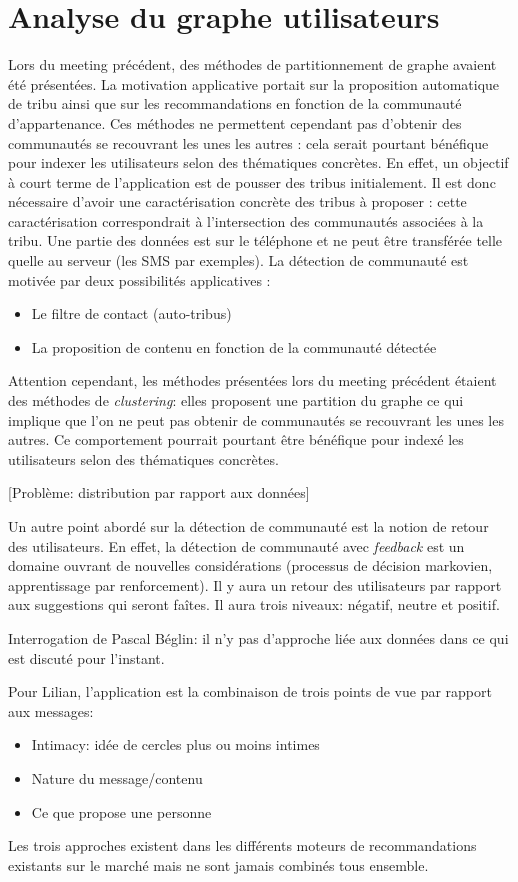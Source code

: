 \documentclass[a4paper]{article}
\begin{document}
\section*{Analyse du graphe utilisateurs}
\label{sec:community_detection}
Lors du meeting précédent, des méthodes de partitionnement de graphe avaient été
présentées. La motivation applicative portait sur la proposition automatique
de tribu ainsi que sur les recommandations en fonction de la communauté
d'appartenance. Ces méthodes ne permettent cependant pas d'obtenir des communautés
se recouvrant les unes les autres : cela serait pourtant bénéfique pour indexer
les utilisateurs selon des thématiques concrètes. En effet, un objectif à court
terme de l'application est de pousser des tribus initialement. Il est donc
nécessaire d'avoir une caractérisation concrète des tribus à proposer : cette
caractérisation correspondrait à l'intersection des communautés associées à la
tribu.
Une partie des données est sur le téléphone et ne peut être transférée telle
quelle au serveur (les SMS par exemples).
La détection de communauté est motivée par deux possibilités applicatives :
\begin{itemize}
    \item Le filtre de contact (auto-tribus)
    \item La proposition de contenu en fonction de la communauté détectée
\end{itemize}
Attention cependant, les méthodes présentées lors du meeting précédent étaient
des méthodes de \emph{clustering}: elles proposent une partition du graphe ce
qui implique que l'on ne peut pas obtenir de communautés se recouvrant les unes
les autres. Ce comportement pourrait pourtant être bénéfique pour indexé les
utilisateurs selon des thématiques concrètes.

[Problème: distribution par rapport aux données]

Un autre point abordé sur la détection de communauté est la notion de retour
des utilisateurs. En effet, la détection de communauté avec \emph{feedback} est
un domaine ouvrant de nouvelles considérations (processus de décision
markovien, apprentissage par renforcement). Il y aura un retour des
utilisateurs par rapport aux suggestions qui seront faîtes. Il aura trois
niveaux: négatif, neutre et positif.

Interrogation de Pascal Béglin: il n'y pas d'approche liée aux données dans ce
qui est discuté pour l'instant.

Pour Lilian, l'application est la combinaison de trois points de vue par
rapport aux messages:
\begin{itemize}
    \item Intimacy: idée de cercles plus ou moins intimes
    \item Nature du message/contenu
    \item Ce que propose une personne
\end{itemize}
Les trois approches existent dans les différents moteurs de recommandations
existants sur le marché mais ne sont jamais combinés tous ensemble.
\end{document}

